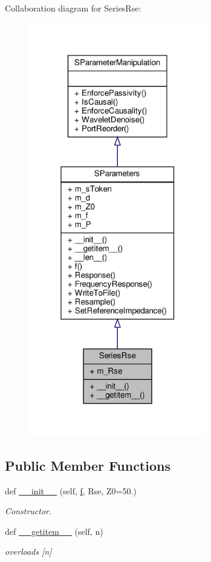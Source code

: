 Collaboration diagram for Series\+Rse\+:
\nopagebreak
\begin{figure}[H]
\begin{center}
\leavevmode
\includegraphics[width=220pt]{classSignalIntegrity_1_1SParameters_1_1Devices_1_1SeriesRse_1_1SeriesRse__coll__graph}
\end{center}
\end{figure}
\subsection*{Public Member Functions}
\begin{DoxyCompactItemize}
\item 
def \hyperlink{classSignalIntegrity_1_1SParameters_1_1Devices_1_1SeriesRse_1_1SeriesRse_a669a93314734d1e46d96dbe25a94b13c}{\+\_\+\+\_\+init\+\_\+\+\_\+} (self, \hyperlink{classSignalIntegrity_1_1SParameters_1_1SParameters_1_1SParameters_a32e7a34d6837fe949b413c852a0447f8}{f}, Rse, Z0=50.)
\begin{DoxyCompactList}\small\item\em Constructor. \end{DoxyCompactList}\item 
def \hyperlink{classSignalIntegrity_1_1SParameters_1_1Devices_1_1SeriesRse_1_1SeriesRse_ab7a6da5139e0878b590d68292aaa70f2}{\+\_\+\+\_\+getitem\+\_\+\+\_\+} (self, n)
\begin{DoxyCompactList}\small\item\em overloads \mbox{[}n\mbox{]} \end{DoxyCompactList}\end{DoxyCompactItemize}


